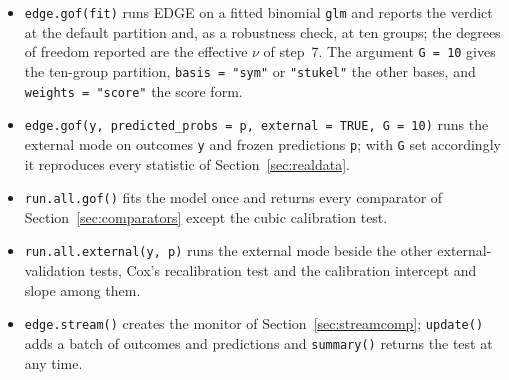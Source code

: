 \begin{itemize}
\item \texttt{edge.gof(fit)} runs EDGE on a fitted binomial \texttt{glm} and reports the verdict at the
default partition and, as a robustness check, at ten groups; the degrees of freedom reported are the
effective $\nu$ of step~7. The argument \texttt{G = 10} gives the ten-group partition, \texttt{basis =
"sym"} or \texttt{"stukel"} the other bases, and \texttt{weights = "score"} the score form.
\item \texttt{edge.gof(y, predicted\_probs = p, external = TRUE, G = 10)} runs the external mode on
outcomes \texttt{y} and frozen predictions \texttt{p}; with \texttt{G} set accordingly it reproduces
every statistic of Section~\ref{sec:realdata}.
\item \texttt{run.all.gof()} fits the model once and returns every comparator of
Section~\ref{sec:comparators} except the cubic calibration test.
\item \texttt{run.all.external(y, p)} runs the external mode beside the other external-validation
tests, Cox's recalibration test and the calibration intercept and slope among them.
\item \texttt{edge.stream()} creates the monitor of Section~\ref{sec:streamcomp}; \texttt{update()} adds
a batch of outcomes and predictions and \texttt{summary()} returns the test at any time.
\end{itemize}
